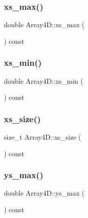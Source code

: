 \mbox{\label{class_array4_d_a4668c9767181db6bd228e054a3f81696}} 
\subsubsection{\texorpdfstring{xs\+\_\+max()}{xs\_max()}}
{\footnotesize\ttfamily double Array4\+D\+::xs\+\_\+max (\begin{DoxyParamCaption}{ }\end{DoxyParamCaption}) const}

\mbox{\label{class_array4_d_a642efdce56ea7ffaf7e24ed1d63b3151}} 
\subsubsection{\texorpdfstring{xs\+\_\+min()}{xs\_min()}}
{\footnotesize\ttfamily double Array4\+D\+::xs\+\_\+min (\begin{DoxyParamCaption}{ }\end{DoxyParamCaption}) const}

\mbox{\label{class_array4_d_a440c545fcf694923767581f590d808df}} 
\subsubsection{\texorpdfstring{xs\+\_\+size()}{xs\_size()}}
{\footnotesize\ttfamily size\+\_\+t Array4\+D\+::xs\+\_\+size (\begin{DoxyParamCaption}{ }\end{DoxyParamCaption}) const}

\mbox{\label{class_array4_d_a1e142285afbb8b00662d8f77f0b92b80}} 
\subsubsection{\texorpdfstring{ys\+\_\+max()}{ys\_max()}}
{\footnotesize\ttfamily double Array4\+D\+::ys\+\_\+max (\begin{DoxyParamCaption}{ }\end{DoxyParamCaption}) const}

